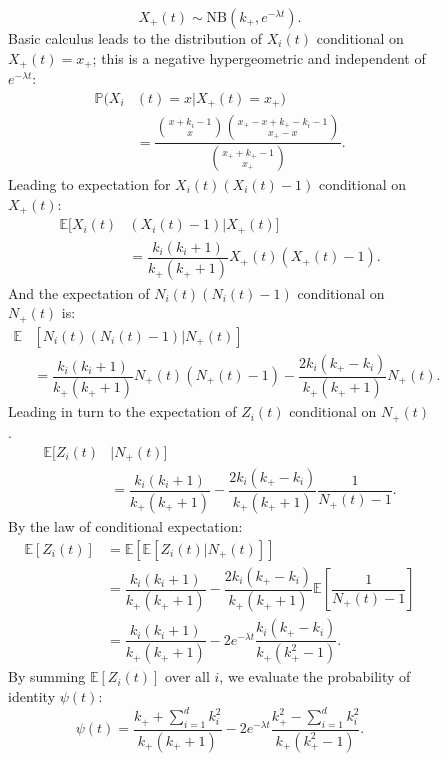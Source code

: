 \documentclass[10pt]{article}
\newcommand{\pr}{{\mathbb{P}}}
\begin{document}
\begin{multicols}{2}
\begin{figure}[hbtp!]
\begin{mdframed}
\begin{multicols}{2}
\begin{equation}
 X_+(t)  \sim \mathrm{NB} \left( k_+, e^{-\lambda t} \right).
\end{equation}
Basic calculus leads to the distribution of $X_i(t)$ conditional on $ X_+(t)=x_+ $; this is a negative hypergeometric and independent of $e^{-\lambda t}$:
\begin{align}
\pr( X_i & (t) =x \vert X_+(t)=x_+ )  \nonumber \\
& = \dfrac{\displaystyle \binom{x+k_i-1}{x} \binom{x_+-x+k_+-k_i-1}{x_+-x}}{\displaystyle \binom{x_+ +k_+ -1}{x_+}}.
\end{align}
Leading to expectation for $X_i(t)(X_i(t)-1)$ conditional on $X_+(t)$:
\begin{align}
 \mathbb{E} [ X_i(t)& (X_i(t)-1) \vert X_+(t) ]  \nonumber \\
 &=\dfrac{k_i(k_i+1)}{k_+ (k_+ +1 )}X_+(t) ( X_+(t) -1 ).
\end{align}
And the expectation of $N_i(t)(N_i(t)-1)$ conditional on $N_+(t)$ is:
\begin{align}
 \mathbb{E} & [ N_i(t) (N_i(t)-1) \vert N_+(t) ]   \nonumber \\
 &=\dfrac{k_i(k_i+1) }{k_+ (k_+ +1)}N_+(t) ( N_+(t) -1 ) -\dfrac{2 k_i (k_+ - k_i) }{k_+ (k_+ +1)} N_+(t) .
\end{align}
Leading in turn to the expectation of $Z_i(t)$ conditional on $N_+(t)$.
\begin{align}
  \mathbb{E} [  Z_i(t)  & \vert N_+(t) ]  \nonumber \\
 &= \dfrac{k_i(k_i+1)}{k_+ (k_+ +1)}- \dfrac{2 k_i (k_+ -k_i)}{k_+ (k_+ +1)} \dfrac{1}{ N_+(t) -1  }.
\end{align}
By the law of conditional expectation:
\begin{align}
\mathbb{E}\left[ Z_i(t) \right] &=
 \mathbb{E}\left[ \mathbb{E}\left[ \left. Z_i(t) \right\vert N_+(t) \right] \right]\\
 &=\dfrac{k_i(k_i+1)}{k_+ (k_+ +1 )}-\dfrac{2 k_i (k_+ -k_i)}{k_+ (k_+ +1 )}\mathbb{E}\left[\dfrac{1}{N_+(t)-1} \right] \\
 & =\dfrac{k_i(k_i+1)}{k_+ (k_+ +1 )}-2e^{-\lambda t}\dfrac{ k_i (k_+ -k_i)}{k_+ (k_+^2 -1 )}.
\end{align}
By summing $\mathbb{E}\left[ Z_i(t) \right]$ over all $i$, we evaluate the probability of identity $\psi(t)$:
\begin{equation}
\psi(t) =\dfrac{ k_+ + \sum_{i=1}^d k_i^2}{k_+ (k_+ +1)}  -2 e^{-\lambda t} \dfrac{ k_+^2-\sum_{i=1}^d k_i^2}{k_+ (k_+^2 -1) }.

\end{equation}
\end{multicols}
\end{mdframed}
\end{figure}
\end{multicols}
\end{document}
